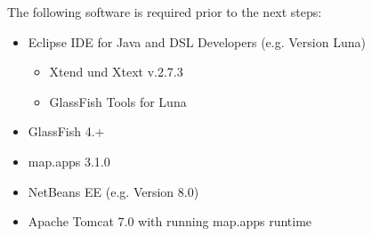 


The following software is required prior to the next steps:


\begin{itemize}
\item Eclipse IDE for Java and DSL Developers (e.g. Version Luna)
\begin{itemize}
\item Xtend und Xtext v.2.7.3
\item GlassFish Tools for Luna
\end{itemize}
\item GlassFish 4.+
\item map.apps 3.1.0
\item NetBeans EE (e.g. Version 8.0)
\item Apache Tomcat 7.0 with running map.apps runtime
\end{itemize}



